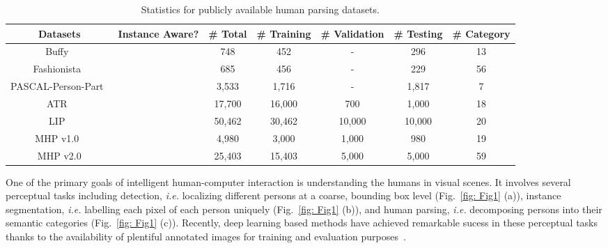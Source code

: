 \documentclass[10pt,twocolumn,letterpaper]{article}
\newcommand{\cmark}{\ding{51}}%
\newcommand{\xmark}{\ding{55}}%
\theoremstyle{definition}
\theoremstyle{remark}
\begin{document}
\begin{table*}[t]
	\newcommand{\tabincell}[2]{\begin{tabular}{@{}#1@{}}#2\end{tabular}}
	\begin{center}
		\scriptsize
		\caption{\small Statistics for publicly available human parsing datasets.}
		\label{tab: Tab1}
		\vspace{-3mm}
		\begin{tabular}{ccccccc}
			\hline{Datasets} & {Instance Aware?} & {\# Total} & {\# Training} & {\# Validation} & {\# Testing} & {\# Category} \\
			\hline
			Buffy~\cite{vineet2011human} & \cmark & 748 & 452 & - & 296 & 13 \\
			Fashionista~\cite{yamaguchi2012parsing} & \xmark & 685 & 456 & - & 229 & 56 \\
			PASCAL-Person-Part~\cite{chen2014detect} & \xmark & 3{,}533 & 1{,}716 & - & 1{,}817 & 7 \\
			ATR~\cite{liang2015human} & \xmark & 17{,}700 & 16{,}000 & 700 & 1{,}000 & 18 \\
			LIP~\cite{gong2017look} & \xmark & 50{,}462 & 30{,}462 & 10{,}000 & 10{,}000 & 20 \\
			MHP v1.0~\cite{li2017towards} & \cmark & 4{,}980 & 3{,}000 & 1{,}000 & 980 & 19 \\
			\hline
			MHP v2.0 & \cmark & 25{,}403 & 15{,}403 & 5{,}000 & 5{,}000 & 59 \\			
			\hline
		\end{tabular}
	\end{center}
	\vspace{-6mm}
\end{table*}

One of the primary goals of intelligent human-computer interaction is understanding the humans in visual scenes. It involves several perceptual tasks including detection, \emph{i.e.} localizing different persons at a coarse, bounding box level (Fig.~\ref{fig: Fig1} (a)), instance segmentation, \emph{i.e.} labelling each pixel of each person uniquely (Fig.~\ref{fig: Fig1} (b)), and human parsing, \emph{i.e.}  decomposing persons into their semantic categories (Fig.~\ref{fig: Fig1} (c)). Recently, deep learning based methods have achieved remarkable sucess in these perceptual tasks thanks to the availability of plentiful annotated images for training and evaluation purposes~\cite{dollar2012pedestrian, everingham2015pascal, lin2014microsoft, gong2017look}.
\end{document}
